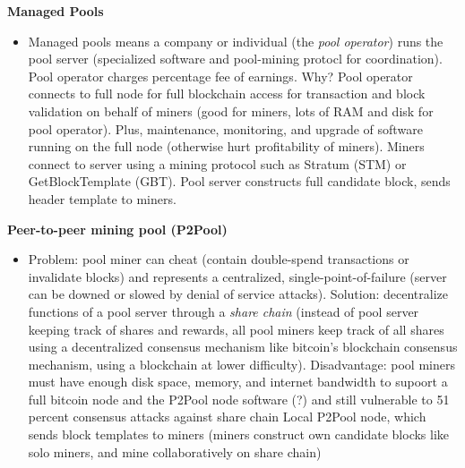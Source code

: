 \documentclass[english, 11pt]{article}
\begin{document}
\noindent \textbf{Managed Pools}
\begin{itemize}
    \item Managed pools means a company or individual (the \textit{pool operator}) runs the pool server (specialized software and pool-mining protocl for coordination). Pool operator charges percentage fee of earnings. Why? Pool operator connects to full node for full blockchain access for transaction and block validation on behalf of miners (good for miners, lots of RAM and disk for pool operator). Plus, maintenance, monitoring, and upgrade of software running on the full node (otherwise hurt profitability of miners). Miners connect to server using a mining protocol such as Stratum (STM) or GetBlockTemplate (GBT). Pool server constructs full candidate block, sends header template to miners. 
\end{itemize}

\noindent \textbf{Peer-to-peer mining pool (P2Pool)}
\begin{itemize}
    \item Problem: pool miner can cheat (contain double-spend transactions or invalidate blocks) and represents a centralized, single-point-of-failure (server can be downed or slowed by denial of service attacks). Solution: decentralize functions of a pool server through a \textit{share chain} (instead of pool server keeping track of shares and rewards, all pool miners keep track of all shares using a decentralized consensus mechanism like bitcoin's blockchain consensus mechanism, using a blockchain at lower difficulty). Disadvantage: pool miners must have enough disk space, memory, and internet bandwidth to supoort a full bitcoin node and the P2Pool node software (?) and still vulnerable to 51 percent consensus attacks against share chain Local P2Pool node, which sends block templates to miners (miners construct own candidate blocks like solo miners, and mine collaboratively on share chain)
\end{itemize}
\end{document}
